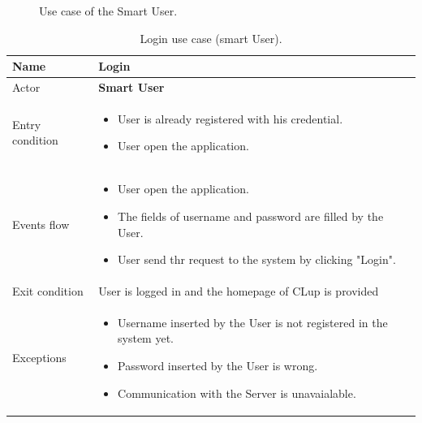 \begin{figure}[H]
  \centering
    \caption{Use case of the Smart User.}
\end{figure}

\pagebreak

\begin{table}[H]\begin{tabular}{|p{5cm} | p{7cm} | }
\hline
Name & \textbf{Login} \\
\hline
Actor & \textbf{Smart User} \\
\hline
Entry condition &
\begin{itemize}
\item User is already registered with his credential. 
\item User open the application.
\end{itemize} \\
\hline
Events flow & 
\begin{itemize}
	\item User open the application.
	\item The fields of username and password are filled by the User. 
	\item User send thr request to the system by clicking "Login".
\end{itemize} \\
\hline
Exit condition & User is logged in and the homepage of CLup is provided \\
\hline 
Exceptions &
\begin{itemize}
	\item Username inserted by the User is not registered in the system yet.
	\item Password inserted by the User is wrong.
    \item Communication with the Server is unavaialable.
\end{itemize} \\
\hline
\end{tabular}

\caption{Login use case (smart User).}

\end{table}

